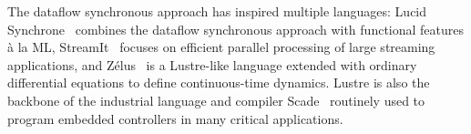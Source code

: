The dataflow synchronous approach has inspired
multiple languages: \textsf{Lucid Synchrone}~\cite{lucid_2006} combines the
dataflow synchronous approach with functional features \`a la ML,
\textsf{StreamIt}~\cite{thies_et_al_2002} focuses on efficient parallel processing of large
streaming applications, and Z\'elus~\cite{zelus_2013} is a Lustre-like
language extended with ordinary differential equations to define
contin\-uous-time dynamics. Lustre is also the backbone of the
industrial language and compiler Scade~\cite{scade_2017} routinely
used to program embedded controllers in many critical applications.
